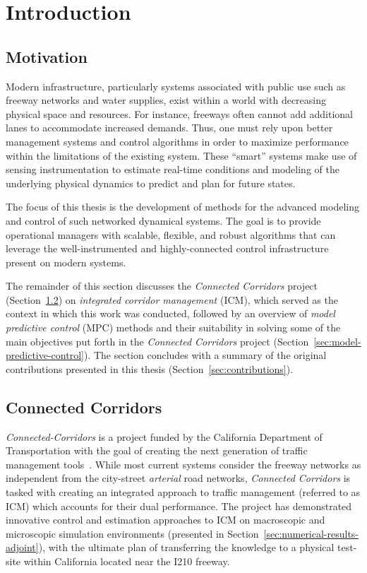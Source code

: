 \chapter{Introduction}
\label{sec:introduction}

\section{Motivation}
\label{sec:motivation}


Modern infrastructure, particularly systems associated with public use such as freeway networks and water supplies, exist within a world with decreasing physical space and resources. For instance, freeways often cannot add additional lanes to accommodate increased demands. Thus, one must rely upon better management systems and control algorithms in order to maximize performance within the limitations of the existing system. These ``smart'' systems make use of sensing instrumentation to estimate real-time conditions and modeling of the underlying physical dynamics to predict and plan for future states.

The focus of this thesis is the development of methods for the advanced modeling and control of such networked dynamical systems. The goal is to provide operational managers with scalable, flexible, and robust algorithms that can leverage the well-instrumented and highly-connected control infrastructure present on modern systems. 

The remainder of this section discusses the \emph{Connected Corridors} project (Section~\ref{sec:connected-corridors}) on \emph{integrated corridor management} (ICM), which served as the context in which this work was conducted, followed by an overview of \emph{model predictive control} (MPC) methods and their suitability in solving some of the main objectives put forth in the \emph{Connected Corridors} project (Section~\ref{sec:model-predictive-control}). The section concludes with a summary of the original contributions presented in this thesis (Section~\ref{sec:contributions}).

\section{Connected Corridors}
\label{sec:connected-corridors}

\emph{Connected-Corridors} is a project funded by the California Department of Transportation with the goal of creating the next generation of traffic management tools~\cite{connected-corridors,miller2010san}. While most current systems consider the freeway networks as independent from the city-street \emph{arterial} road networks, \emph{Connected Corridors} is tasked with creating an integrated approach to traffic management (referred to as ICM) which accounts for their dual performance. The project has demonstrated innovative control and estimation approaches to ICM on macroscopic and microscopic simulation environments (presented in Section~\ref{sec:numerical-results-adjoint}), with the ultimate plan of transferring the knowledge to a physical test-site within California located near the I210 freeway.

